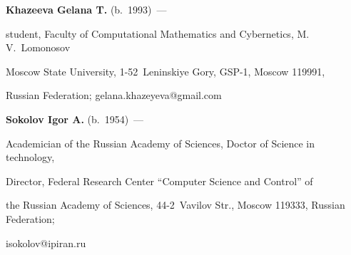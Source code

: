 \noindent


\textbf{Khazeeva Gelana T.} (b.\ 1993)~---


 student,  Faculty of Computational Mathematics and Cybernetics, M.\,V.~Lo\-monosov 


 Moscow State University, 1-52~Leninskiye Gory, GSP-1, Moscow 119991, 


 Russian Federation; \mbox{gelana.khazeyeva@gmail.com} 





 


 \vspace*{1pt}


 


\noindent


\textbf{Sokolov Igor A.} (b.\ 1954)~---


Academician of the Russian Academy of Sciences, Doctor of Science in technology, 


Director, Federal Research Center ``Computer Science and Control'' of 


the Russian Academy of Sciences, 44-2~Vavilov Str., Moscow 119333, Russian Federation; 


\mbox{isokolov@ipiran.ru}


\label{end\stat}








\renewcommand{\bibname}{\protect\rm Литература} 


